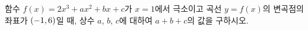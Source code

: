 함수 $f(x)=2x^3+ax^2+bx+c$가 $x=1$에서 극소이고 곡선 $y=f(x)$의 변곡점의 좌표가 $(-1{,}\mkern3mu\mathopen{}6)$일 때, 상수 $a$, $b$, $c$에 대하여 $a+b+c$의 값을 구하시오.

